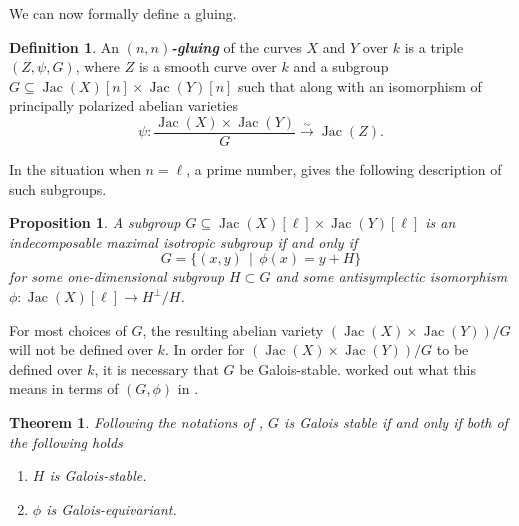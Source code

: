 \documentclass{amsproc}
\numberwithin{equation}{section}
\newtheorem{theorem}[equation]{Theorem}
\newtheorem{proposition}[equation]{Proposition}
\theoremstyle{definition}
\newtheorem{definition}[equation]{Definition}
\theoremstyle{remark}
\newcommand{\vocab}[1]{\textbf{\textit{\boldmath #1}}}
\DeclareMathOperator{\Jac}{Jac}
\begin{document}
We can now formally define a gluing.

\begin{definition}
    \label{def:gluing}
    An \vocab{$(n,n)$-gluing} of the curves $X$ and $Y$ over $k$ is a triple $(Z,\psi, G)$, where $Z$ is a smooth curve over $k$ and a subgroup $G\subseteq \Jac(X)[n]\times\Jac(Y)[n]$ such that along with an isomorphism of principally polarized abelian varieties
    \begin{equation}
    \psi : \frac{\Jac(X)\times \Jac(Y)}{G} \stackrel{\sim}{\longrightarrow} \Jac(Z).
    \end{equation}
\end{definition}

In the situation when $n=\ell$, a prime number, \cite[\S 1]{1_plus_2_2_torsion_gluing} gives the following description of such subgroups.
\begin{proposition} \textnormal{\cite[Prop.~1.18]{1_plus_2_2_torsion_gluing}}
    \label{prop:complex-gluability}
    A subgroup $G\subseteq \Jac(X)[\ell]\times\Jac(Y)[\ell]$ is an indecomposable maximal isotropic subgroup if and only if 
    \begin{equation}
    G = \{(x, y)\,\mid\,\phi(x) = y + H\}
    \end{equation}
    for some one-dimensional subgroup $H \subset G$ and some antisymplectic isomorphism $\phi: \Jac(X)[\ell] \to H^\perp/H$.
\end{proposition}

For most choices of $G$, the resulting abelian variety $(\Jac(X)\times \Jac(Y))/G$ will not be defined over $k$.
In order for $(\Jac(X)\times \Jac(Y))/G$ to be defined over $k$,
it is necessary that $G$ be Galois-stable.
\cite[Prop.~1.39]{1_plus_2_2_torsion_gluing} worked out what this means in terms of $(G,\phi)$ in .

\begin{theorem}
\label{thm:gluability} \textnormal{\cite[Prop.~1.39]{1_plus_2_2_torsion_gluing}}
Following the notations of , $G$ is Galois stable if and only if both of the following holds
\begin{enumerate}
    \item[(i)]\label{thm-cond:H-stability} $H$ is Galois-stable.
    \item[(ii)]\label{thm-cond:phi-equivariance} $\phi$ is Galois-equivariant.
\end{enumerate}
\end{theorem}
\end{document}
